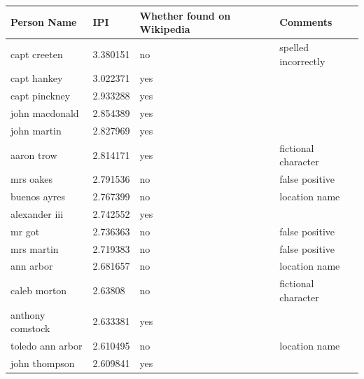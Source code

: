 \documentclass[letterpaper,11pt]{report}
\begin{document}
\begin{table}[h]
\centering
\begin{tabular}{|l|l|p{3cm}|p{3cm}|}

\hline

\textbf{Person Name}      & \textbf{IPI}      & \textbf{Whether found on Wikipedia} & \textbf{Comments}                                     \\ \hline
capt creeten     & 3.380151 & no                 & spelled incorrectly \\ \hline
capt hankey      & 3.022371 & yes                &                                      \\ \hline
capt pinckney    & 2.933288 & yes                &                                      \\ \hline
john macdonald   & 2.854389 & yes                &                                      \\ \hline
john martin      & 2.827969 & yes                &                                      \\ \hline
aaron trow       & 2.814171 & yes                & fictional character                  \\ \hline
mrs oakes        & 2.791536 & no                 & false positive                       \\ \hline
buenos ayres     & 2.767399 & no                 & location name                            \\ \hline
alexander iii    & 2.742552 & yes                &                                      \\ \hline
mr got           & 2.736363 & no                 & false positive                       \\ \hline
mrs martin       & 2.719383 & no                 & false positive                       \\ \hline
ann arbor        & 2.681657 & no                 & location name                            \\ \hline
caleb morton     & 2.63808  & no                 & fictional character                  \\ \hline
anthony comstock & 2.633381 & yes                &                                      \\ \hline
toledo ann arbor & 2.610495 & no                 & location name                            \\ \hline
john thompson    & 2.609841 & yes                &                                      \\ \hline

\end{tabular}
\end{table}
\end{document}
